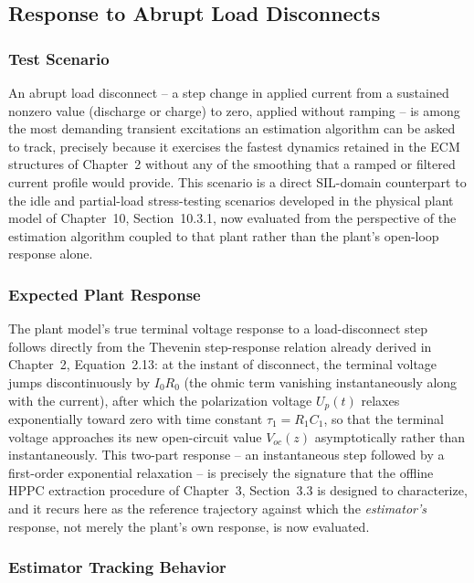 \subsection{Response to Abrupt Load Disconnects}
\label{ssec:load_disconnect}

\subsubsection{Test Scenario}

An abrupt load disconnect -- a step change in applied current from a sustained nonzero value (discharge or charge) to zero, applied without ramping -- is among the most demanding transient excitations an estimation algorithm can be asked to track, precisely because it exercises the fastest dynamics retained in the ECM structures of Chapter~2 without any of the smoothing that a ramped or filtered current profile would provide. This scenario is a direct SIL-domain counterpart to the idle and partial-load stress-testing scenarios developed in the physical plant model of Chapter~10, Section~10.3.1, now evaluated from the perspective of the estimation algorithm coupled to that plant rather than the plant's open-loop response alone.

\subsubsection{Expected Plant Response}

The plant model's true terminal voltage response to a load-disconnect step follows directly from the Thevenin step-response relation already derived in Chapter~2, Equation~2.13: at the instant of disconnect, the terminal voltage jumps discontinuously by $I_0 R_0$ (the ohmic term vanishing instantaneously along with the current), after which the polarization voltage $U_p(t)$ relaxes exponentially toward zero with time constant $\tau_1 = R_1 C_1$, so that the terminal voltage approaches its new open-circuit value $V_{oc}(z)$ asymptotically rather than instantaneously. This two-part response -- an instantaneous step followed by a first-order exponential relaxation -- is precisely the signature that the offline HPPC extraction procedure of Chapter~3, Section~3.3 is designed to characterize, and it recurs here as the reference trajectory against which the \emph{estimator's} response, not merely the plant's own response, is now evaluated.

\subsubsection{Estimator Tracking Behavior}


